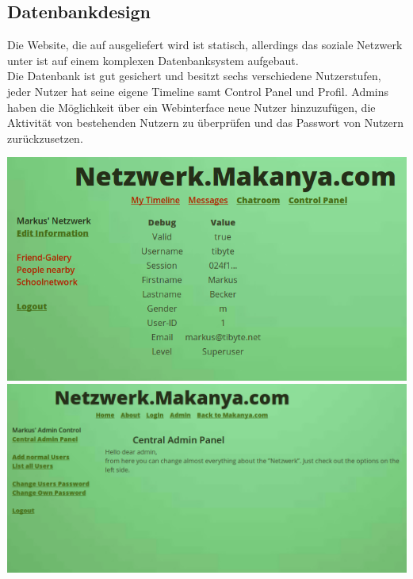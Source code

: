 \subsection{Datenbankdesign}
Die Website, die auf  ausgeliefert wird ist statisch, allerdings das soziale Netzwerk unter
 ist auf einem komplexen Datenbanksystem aufgebaut.\\
Die Datenbank ist gut gesichert und besitzt sechs verschiedene Nutzerstufen, jeder Nutzer hat seine eigene Timeline
samt Control Panel und Profil. Admins haben die Möglichkeit über ein Webinterface neue Nutzer hinzuzufügen, die Aktivität
von bestehenden Nutzern zu überprüfen und das Passwort von Nutzern zurückzusetzen.
\begin{center}
\includegraphics[width=\linewidth]{imgs/wmsnetz.png}
\includegraphics[width=\linewidth]{imgs/adminnety.png}
\end{center}

